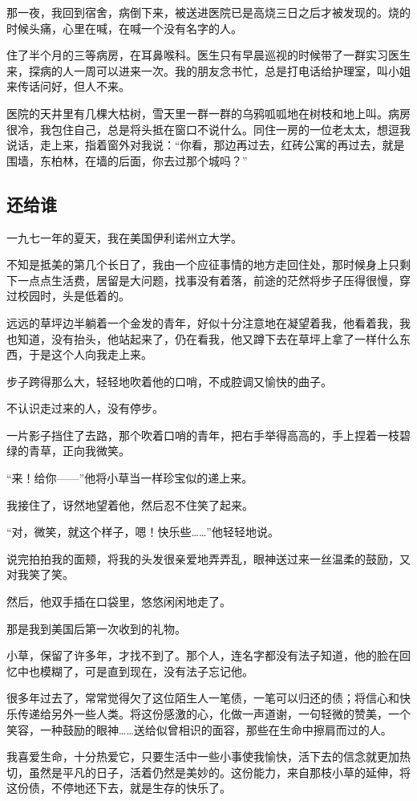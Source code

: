 \par 那一夜，我回到宿舍，病倒下来，被送进医院已是高烧三日之后才被发现的。烧的时候头痛，心里在喊，在喊一个没有名字的人。
\par 住了半个月的三等病房，在耳鼻喉科。医生只有早晨巡视的时候带了一群实习医生来，探病的人一周可以进来一次。我的朋友念书忙，总是打电话给护理室，叫小姐来传话问好，但人不来。
\par 医院的天井里有几棵大枯树，雪天里一群一群的乌鸦呱呱地在树枝和地上叫。病房很冷，我包住自己，总是将头抵在窗口不说什么。同住一房的一位老太太，想逗我说话，走上来，指着窗外对我说：“你看，那边再过去，红砖公寓的再过去，就是围墙，东柏林，在墙的后面，你去过那个城吗？”




\subsection{还给谁}


\par 一九七一年的夏天，我在美国伊利诺州立大学。
\par 不知是抵美的第几个长日了，我由一个应征事情的地方走回住处，那时候身上只剩下一点点生活费，居留是大问题，找事没有着落，前途的茫然将步子压得很慢，穿过校园时，头是低着的。
\par 远远的草坪边半躺着一个金发的青年，好似十分注意地在凝望着我，他看着我，我也知道，没有抬头，他站起来了，仍在看我，他又蹲下去在草坪上拿了一样什么东西，于是这个人向我走上来。
\par 步子跨得那么大，轻轻地吹着他的口哨，不成腔调又愉快的曲子。
\par 不认识走过来的人，没有停步。
\par 一片影子挡住了去路，那个吹着口哨的青年，把右手举得高高的，手上捏着一枝碧绿的青草，正向我微笑。
\par “来！给你——”他将小草当一样珍宝似的递上来。
\par 我接住了，讶然地望着他，然后忍不住笑了起来。
\par “对，微笑，就这个样子，嗯！快乐些……”他轻轻地说。
\par 说完拍拍我的面颊，将我的头发很亲爱地弄弄乱，眼神送过来一丝温柔的鼓励，又对我笑了笑。
\par 然后，他双手插在口袋里，悠悠闲闲地走了。
\par 那是我到美国后第一次收到的礼物。
\par 小草，保留了许多年，才找不到了。那个人，连名字都没有法子知道，他的脸在回忆中也模糊了，可是直到现在，没有法子忘记他。
\par 很多年过去了，常常觉得欠了这位陌生人一笔债，一笔可以归还的债；将信心和快乐传递给另外一些人类。将这份感激的心，化做一声道谢，一句轻微的赞美，一个笑容，一种鼓励的眼神……送给似曾相识的面容，那些在生命中擦肩而过的人。
\par 我喜爱生命，十分热爱它，只要生活中一些小事使我愉快，活下去的信念就更加热切，虽然是平凡的日子，活着仍然是美妙的。这份能力，来自那枝小草的延伸，将这份债，不停地还下去，就是生存的快乐了。




